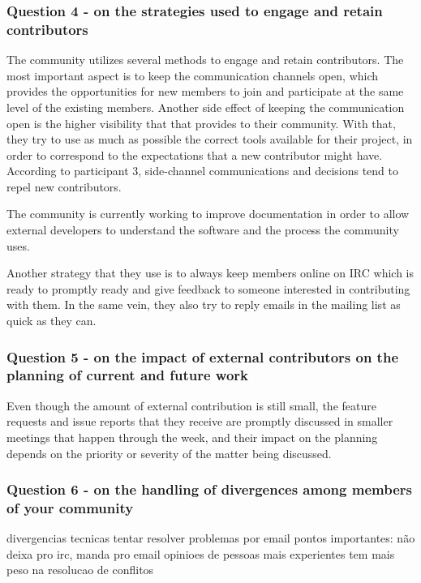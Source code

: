 \documentclass{sigchi}
\begin{document}
\subsubsection{Question 4 - on the strategies used to engage and retain contributors}

The community utilizes several methods to engage and retain contributors. The most important aspect is to keep the communication channels open, which provides the opportunities for new members to join and participate at the same level of the existing members. Another side effect of keeping the communication open is the higher visibility that that provides to their community. With that, they try to use as much as possible the correct tools available for their project, in order to correspond to the expectations that a new contributor might have. According to participant 3, side-channel communications and decisions tend to repel new contributors.

The community is currently working to improve documentation in order to allow external developers to understand the software and the process the community uses.

Another strategy that they use is to always keep members online on IRC which is ready to promptly ready and give feedback to someone interested in contributing with them. In the same vein, they also try to reply emails in the mailing list as quick as they can.

\subsubsection{Question 5 - on the impact of external contributors on the planning of current and future work}

Even though the amount of external contribution is still small, the feature requests and issue reports that they receive are promptly discussed in smaller meetings that happen through the week, and their impact on the planning depends on the priority or severity of the matter being discussed.

\subsubsection{Question 6 - on the handling of divergences among members of your community}
divergencias tecnicas
tentar resolver problemas por email
pontos importantes: não deixa pro irc, manda pro email
opinioes de pessoas mais experientes tem mais peso na resolucao de conflitos
\end{document}
